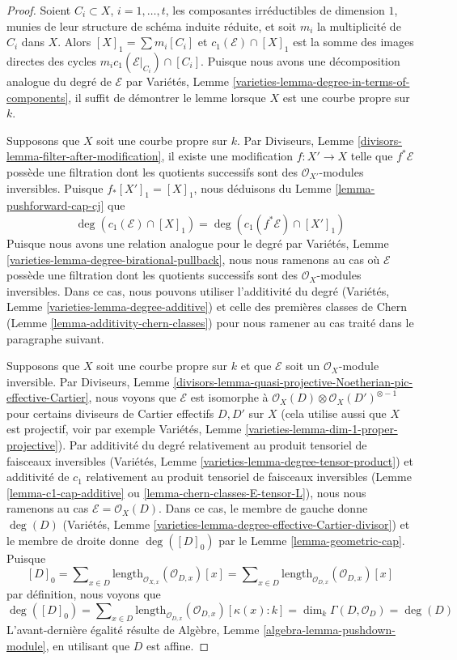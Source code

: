 \begin{proof}
Soient $C_i \subset X$, $i = 1, \ldots, t$, les composantes irréductibles
de dimension $1$, munies de leur structure de schéma induite réduite, et soit $m_i$ la
multiplicité de $C_i$ dans $X$. Alors $[X]_1 = \sum m_i[C_i]$ et
$c_1(\mathcal{E}) \cap [X]_1$ est la somme des images directes des cycles
$m_i c_1(\mathcal{E}|_{C_i}) \cap [C_i]$. Puisque nous avons une décomposition analogue
du degré de $\mathcal{E}$ par
Variétés, Lemme \ref{varieties-lemma-degree-in-terms-of-components},
il suffit de démontrer le lemme lorsque $X$ est une courbe propre sur $k$.

\medskip\noindent
Supposons que $X$ soit une courbe propre sur $k$.
Par Diviseurs, Lemme \ref{divisors-lemma-filter-after-modification},
il existe une modification $f : X' \to X$ telle que $f^*\mathcal{E}$
possède une filtration dont les quotients successifs sont des
$\mathcal{O}_{X'}$-modules inversibles. Puisque $f_*[X']_1 = [X]_1$, nous déduisons
du Lemme \ref{lemma-pushforward-cap-cj} que
$$
\deg(c_1(\mathcal{E}) \cap [X]_1) = \deg(c_1(f^*\mathcal{E}) \cap [X']_1)
$$
Puisque nous avons une relation analogue pour le degré par
Variétés, Lemme \ref{varieties-lemma-degree-birational-pullback},
nous nous ramenons au cas où $\mathcal{E}$ possède une filtration dont les
quotients successifs sont des $\mathcal{O}_X$-modules inversibles.
Dans ce cas, nous pouvons utiliser l'additivité du degré
(Variétés, Lemme \ref{varieties-lemma-degree-additive})
et celle des premières classes de Chern (Lemme \ref{lemma-additivity-chern-classes})
pour nous ramener au cas traité dans le paragraphe suivant.

\medskip\noindent
Supposons que $X$ soit une courbe propre sur $k$ et que $\mathcal{E}$ soit un
$\mathcal{O}_X$-module inversible. Par
Diviseurs, Lemme
\ref{divisors-lemma-quasi-projective-Noetherian-pic-effective-Cartier},
nous voyons que $\mathcal{E}$ est isomorphe à
$\mathcal{O}_X(D) \otimes \mathcal{O}_X(D')^{\otimes -1}$
pour certains diviseurs de Cartier effectifs $D, D'$ sur $X$ (cela utilise aussi
que $X$ est projectif, voir par exemple
Variétés, Lemme \ref{varieties-lemma-dim-1-proper-projective}).
Par additivité du degré relativement au produit tensoriel de faisceaux inversibles
(Variétés, Lemme \ref{varieties-lemma-degree-tensor-product})
et additivité de $c_1$ relativement au produit tensoriel de faisceaux inversibles
(Lemme \ref{lemma-c1-cap-additive} ou \ref{lemma-chern-classes-E-tensor-L}),
nous nous ramenons au cas $\mathcal{E} = \mathcal{O}_X(D)$.
Dans ce cas, le membre de gauche donne $\deg(D)$
(Variétés, Lemme \ref{varieties-lemma-degree-effective-Cartier-divisor})
et le membre de droite donne $\deg([D]_0)$ par le
Lemme \ref{lemma-geometric-cap}.
Puisque
$$
[D]_0 = \sum\nolimits_{x \in D}
\text{length}_{\mathcal{O}_{X, x}}(\mathcal{O}_{D, x}) [x] =
\sum\nolimits_{x \in D}
\text{length}_{\mathcal{O}_{D, x}}(\mathcal{O}_{D, x}) [x]
$$
par définition, nous voyons que
$$
\deg([D]_0) = \sum\nolimits_{x \in D}
\text{length}_{\mathcal{O}_{D, x}}(\mathcal{O}_{D, x}) [\kappa(x) : k] =
\dim_k \Gamma(D, \mathcal{O}_D) = \deg(D)
$$
L'avant-dernière égalité résulte de
Algèbre, Lemme \ref{algebra-lemma-pushdown-module},
en utilisant que $D$ est affine.
\end{proof}

